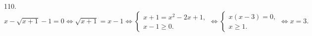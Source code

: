 110. $x-\sqrt{x+1}-1=0\Leftrightarrow \sqrt{x+1}=x-1 \Leftrightarrow \begin{cases}x+1=x^2-2x+1,\\ x-1\geqslant0.\end{cases}\Leftrightarrow
\begin{cases} x(x-3)=0,\\ x\geqslant1.\end{cases}\Leftrightarrow x=3.$\\
